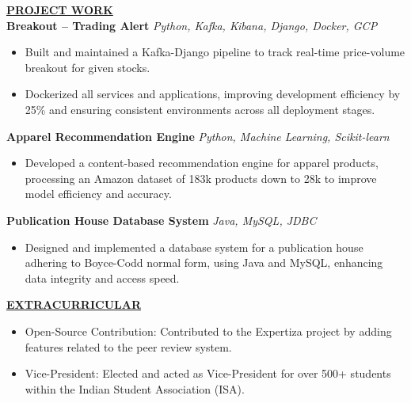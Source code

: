 \documentclass{article}
\begin{document}
\vspace{2mm} 

%
%


\noindent \textbf{\underline{PROJECT WORK}} \\
\noindent \textbf{Breakout – Trading Alert} \textit{Python, Kafka, Kibana, Django, Docker, GCP} \hfill \textbf{}
\begin{itemize}[noitemsep,nolistsep,leftmargin=*]
\item {\small Built and maintained a Kafka-Django pipeline to track real-time price-volume breakout for given stocks.}
\item {\small Dockerized all services and applications, improving development efficiency by 25\% and ensuring consistent environments across all deployment stages.}
\end{itemize}

\noindent \textbf{Apparel Recommendation Engine} \textit{Python, Machine Learning, Scikit-learn} \hfill \textbf{}
\begin{itemize}[noitemsep,nolistsep,leftmargin=*]
\item {\small Developed a content-based recommendation engine for apparel products, processing an Amazon dataset of 183k products down to 28k to improve model efficiency and accuracy.}
\end{itemize}

\noindent \textbf{Publication House Database System} \textit{Java, MySQL, JDBC} \hfill \textbf{}
\begin{itemize}[noitemsep,nolistsep,leftmargin=*]
\item {\small Designed and implemented a database system for a publication house adhering to Boyce-Codd normal form, using Java and MySQL, enhancing data integrity and access speed.}\\
\end{itemize}

\noindent \textbf{\underline{EXTRACURRICULAR}} 
\begin{itemize}[noitemsep,nolistsep,leftmargin=*]
\item {\small Open-Source Contribution: Contributed to the Expertiza project by adding features related to the peer review system.}
\item {\small Vice-President: Elected and acted as Vice-President for over 500+ students within the Indian Student Association (ISA).}
\end{itemize}




\end{document}
